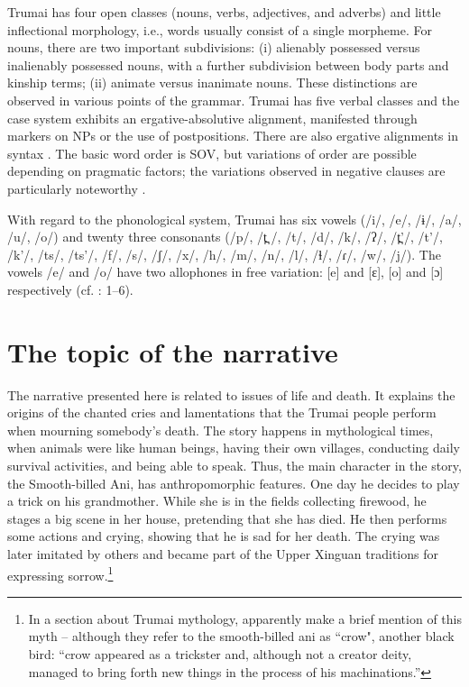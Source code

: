 \documentclass[output=paper,
modfonts,nonflat
]{langsci/langscibook}
\begin{document}
Trumai has four open classes (nouns, verbs, adjectives, and adverbs) and little inflectional morphology, i.e., words usually consist of a single morpheme. For nouns, there are two important subdivisions: 
(i) alienably possessed versus inalienably possessed nouns, with a further subdivision between body parts and kinship terms;  
(ii) animate versus inanimate nouns. These distinctions are observed in various points of the grammar. Trumai has five verbal classes and the case system exhibits an ergative-absolutive alignment, manifested through markers on NPs or the use of postpositions. There are also ergative alignments in syntax \citep{Guirardello-Damian2010}. The basic word order is SOV, but variations of order are possible depending on pragmatic factors; the variations observed in negative clauses are particularly noteworthy \citep{Guirardello1999}.

With regard to the phonological system, Trumai has six vowels (/i/, /e/, /ɨ/, /a/, /u/, /o/) and twenty three consonants (/p/, /t̪ /, /t/, /d/, /k/, /ʔ/, /t̪'/, /t'/, /k'/, /ts/, /ts'/, /f/, /s/, /ʃ/, /x/, /h/, /m/, /n/, /l/, /ɬ/, /ɾ/, /w/, /j/). The vowels /e/ and /o/ have two allophones in free variation: [e] and [ɛ], [o]  and [ɔ] respectively (cf. \citealt{Guirardello1999}: 1--6).



\section{The topic of the narrative} 
The narrative presented here is related to issues of life and death. It explains the origins of the chanted cries and lamentations that the Trumai people perform when mourning somebody's death. The story happens in mythological times, when animals were like human beings, having their own villages, conducting daily survival activities, and being able to speak. Thus, the main character in the story, the Smooth-billed Ani, has anthropomorphic features. One day he decides to play a trick on his grandmother. While she is in the fields collecting firewood, he stages a big scene in her house, pretending that she has died. He then performs some actions and crying, showing that he is sad for her death. The crying was later imitated by others and became part of the Upper Xinguan traditions for expressing sorrow.\footnote{In a section about Trumai mythology, \citet[73]{MurphyQuain1955} apparently make a brief mention of this myth – although they refer to the smooth-billed ani as “crow", another black bird: “crow appeared as a trickster and, although not a creator deity, managed to bring forth new things in the process of his machinations.” }
\end{document}
